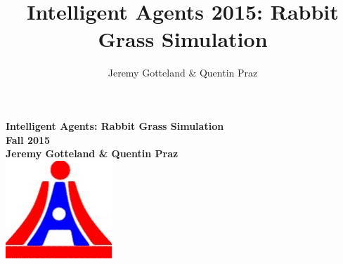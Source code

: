 \documentclass[]{report}
\title{Intelligent Agents 2015: Rabbit Grass Simulation}
\author{Jeremy Gotteland \& Quentin Praz}
\begin{document}
\begin{titlepage}
    \centering
    \vfill
    {\bfseries\Large
       Intelligent Agents: Rabbit Grass Simulation\\
        Fall 2015\\
        \vskip2cm
        Jeremy Gotteland \& Quentin Praz \\
    }    
    \vfill
    \includegraphics[width=4cm]{lia-logo.jpg} %
    \vfill
    \vfill
\end{titlepage}
\end{document}
